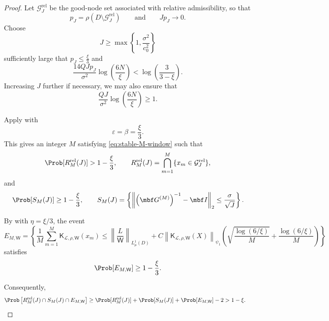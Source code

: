 \documentclass[10pt,dvipsnames]{amsart}
\begin{document}
\stableIntermediateRule*
\begin{proof}
Let \(\mathcal G_J^{\mathrm{rel}}\) be the good-node set associated with
relative admissibility, so that
\[
    p_J
    =
    \rho(D\setminus\mathcal G_J^{\mathrm{rel}})
    \qquad\text{and}\qquad
    Jp_J\longrightarrow0.
\]
Choose
\[
    J\geq
    \max\left\{
        1,\frac{\sigma^2}{c_0^2}
    \right\}
\]
sufficiently large that \(p_J\leq\frac{\xi}{3}\) and
\begin{equation}
\label{eq:stable-window-choice}
    \frac{14QJp_J}{\sigma^2}
    \log\left(\frac{6N}{\xi}\right)
    <
    \log\left(\frac{3}{3-\xi}\right).
\end{equation}
Increasing \(J\) further if necessary, we may also ensure that
\[
    \frac{QJ}{\sigma^2}\log\left(\frac{6N}{\xi}\right)\geq1.
\]

Apply  with
\[
    \varepsilon=\beta=\frac{\xi}{3}.
\]
This gives an integer \(M\) satisfying \eqref{eq:stable-M-window} such that
\[
    \Prob[R_M^{\mathrm{rel}}(J)]>1-\frac{\xi}{3},
    \qquad
    R_M^{\mathrm{rel}}(J)
    =
    \bigcap_{m=1}^M
    \{x_m\in\mathcal G_J^{\mathrm{rel}}\},
\]
and
\[
    \Prob[S_M(J)]\geq1-\frac{\xi}{3},
    \qquad
    S_M(J)
    =
    \left\{
        \left\|
            \left(\mbf G^{(M)}\right)^{-1}-\mbf I
        \right\|_2
        \leq
        \frac{\sigma}{\sqrt J}
    \right\}.
\]

By  with $\eta=\xi/3$, the
event
\[
    E_{M,\mathsf W}
    =
    \left\{
        \frac1M
        \sum_{m=1}^M
        \mathsf K_{\mathcal L,\rho,\mathsf W}(x_m)
        \leq
        \left\|
            \frac{L}{\mathsf W}
        \right\|_{L^1_\mu(D)}
        +
        C
        \left\|
            \mathsf K_{\mathcal L,\rho,\mathsf W}(X)
        \right\|_{\psi_1}
        \left(
        \sqrt{\frac{\log(6/\xi)}{M}}
        +
        \frac{\log(6/\xi)}{M}
        \right)
    \right\}
\]
satisfies
\[
    \Prob[E_{M,\mathsf W}]\geq1-\frac{\xi}{3}.
\]

Consequently,
\begin{align*}
    \Prob\left[
        R_M^{\mathrm{rel}}(J)
        \cap S_M(J)
        \cap E_{M,\mathsf W}
    \right]
    &\geq
    \Prob[R_M^{\mathrm{rel}}(J)]
    +
    \Prob[S_M(J)]
    +
    \Prob[E_{M,\mathsf W}]
    -2 
    >
    1-\xi.
\end{align*}


\end{proof}
\end{document}

